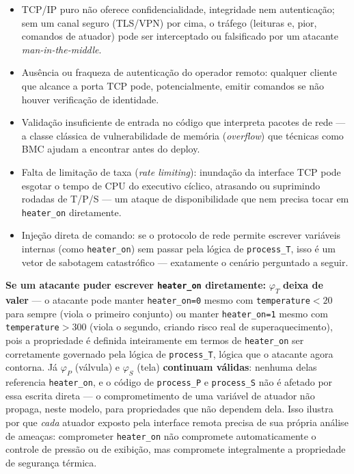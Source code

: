 \documentclass[12pt,a4paper]{article}
\newcommand{\vv}[1]{\texttt{#1}}
\begin{document}
\begin{itemize}[leftmargin=1.7cm]
  \item TCP/IP puro n\~ao oferece confidencialidade, integridade nem autentica\c{c}\~ao;
  sem um canal seguro (TLS/VPN) por cima, o tr\'afego (leituras e, pior, comandos de
  atuador) pode ser interceptado ou falsificado por um atacante \emph{man-in-the-middle}.
  \item Aus\^encia ou fraqueza de autentica\c{c}\~ao do operador remoto: qualquer cliente
  que alcance a porta TCP pode, potencialmente, emitir comandos se n\~ao houver
  verifica\c{c}\~ao de identidade.
  \item Valida\c{c}\~ao insuficiente de entrada no c\'odigo que interpreta pacotes de
  rede --- a classe cl\'assica de vulnerabilidade de mem\'oria (\emph{overflow}) que t\'ecnicas
  como BMC ajudam a encontrar antes do deploy.
  \item Falta de limita\c{c}\~ao de taxa (\emph{rate limiting}): inunda\c{c}\~ao da
  interface TCP pode esgotar o tempo de CPU do executivo c\'iclico, atrasando ou
  suprimindo rodadas de T/P/S --- um ataque de disponibilidade que nem precisa tocar em
  \vv{heater\_on} diretamente.
  \item Inje\c{c}\~ao direta de comando: se o protocolo de rede permite escrever
  vari\'aveis internas (como \vv{heater\_on}) sem passar pela l\'ogica de
  \vv{process\_T}, isso \'e um vetor de sabotagem catastr\'ofico --- exatamente o cen\'ario
  perguntado a seguir.
\end{itemize}

\begin{tcolorbox}[resultbox]
\textbf{Se um atacante puder escrever \vv{heater\_on} diretamente:} $\varphi_T$
\textbf{deixa de valer} --- o atacante pode manter \vv{heater\_on=0} mesmo com
\vv{temperature}$<20$ para sempre (viola o primeiro conjunto) ou manter
\vv{heater\_on=1} mesmo com \vv{temperature}$>300$ (viola o segundo, criando risco real de
superaquecimento), pois a propriedade \'e definida inteiramente em termos de
\vv{heater\_on} ser corretamente governado pela l\'ogica de \vv{process\_T}, l\'ogica que o
atacante agora contorna. J\'a $\varphi_P$ (v\'alvula) e $\varphi_S$ (tela) \textbf{continuam
v\'alidas}: nenhuma delas referencia \vv{heater\_on}, e o c\'odigo de \vv{process\_P} e
\vv{process\_S} n\~ao \'e afetado por essa escrita direta --- o comprometimento de uma
vari\'avel de atuador n\~ao propaga, neste modelo, para propriedades que n\~ao dependem
dela. Isso ilustra por que \emph{cada} atuador exposto pela interface remota precisa de sua
pr\'opria an\'alise de amea\c{c}as: comprometer \vv{heater\_on} n\~ao compromete
automaticamente o controle de press\~ao ou de exibi\c{c}\~ao, mas compromete integralmente a
propriedade de seguran\c{c}a t\'ermica.
\end{tcolorbox}
\end{document}
